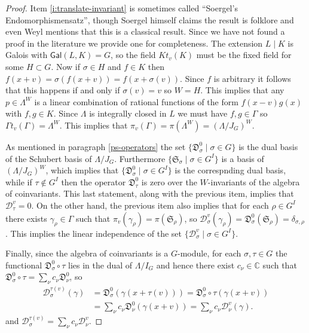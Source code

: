 \documentclass[11pt,fleqn]{article}
\newcommand\CC{\mathbb C}
\newcommand\D{\mathfrak D}
\newcommand\DD{\mathcal D}
\renewcommand\SS{\mathfrak S}
\begin{document}
\begin{proof}
Item \ref{i:translate-invariant} is sometimes called ``Soergel's 
Endomorphismensatz'', though Soergel himself claims the result is folklore and 
even Weyl mentions that this is a classical result. Since we have not found a 
proof in the literature we provide one for completeness. 
The extension $L \mid K$ is Galois with $\mathsf{Gal}(L, K) = G$, so the field
$Kt_v(K)$ must be the fixed field for some $H \subset G$. Now if $\sigma \in 
H$ and $f \in K$ then $f(x+v) = \sigma(f(x+v)) = f(x+\sigma(v))$. Since $f$ is
arbitrary it follows that this happens if and only if $\sigma(v) = v$
so $W = H$. This implies that any $p \in \Lambda^{W}$ is a linear 
combination of rational functions of the form $f(x-v) g(x)$ with 
$f,g \in K$. Since $\Lambda$ is integrally closed in $L$ we must have $f, g 
\in \Gamma$ so $\Gamma t_v(\Gamma) = \Lambda^W$. This implies that 
$\pi_v(\Gamma) = \pi(\Lambda^W) = (\Lambda/J_G)^W$.

As mentioned in paragraph \ref{ps-operators} the set $\{\D_\sigma^0 \mid
\sigma \in G\}$ is the dual basis of the Schubert basis of $\Lambda/J_G$.
Furthermore $\{\SS_\sigma \mid \sigma \in G^I\}$ is a basis of 
$(\Lambda/J_G)^W$, which implies that $\{\D_\sigma^0 \mid \sigma \in G^I\}$
is the correspnding dual basis, while if $\tau \notin G^I$ then the
operator $\D_\tau^0$ is zero over the $W$-invariants of the algebra of 
coinvariants. This last statement, along with the previous item, implies that
$\DD_\tau^v = 0$. On the other hand, the previous item also implies that for 
each $\rho \in G^I$ there exists $\gamma_\rho \in \Gamma$ such that
$\pi_v(\gamma_\rho) = \pi(\SS_\rho)$, so $\DD_\sigma^v(\gamma_\rho) = 
\D_\sigma^0(\SS_\rho) = \delta_{\sigma, \rho}$. This implies the linear 
independence of the set $\{\DD_\sigma^v \mid \sigma \in G^I\}$.

Finally, since the algebra of coinvariants is a $G$-module, for each $\sigma, 
\tau \in G$ the functional $\D_\sigma^0 \circ \tau$ lies in the dual of 
$\Lambda/I_G$ and hence there exist $c_\nu \in \CC$ such that $\D_\sigma^0 
\circ \tau = \sum_\nu c_\nu \D_\nu^0$, so
\begin{align*}
\DD_\sigma^{\tau(v)}(\gamma) 
	&= \D_\sigma^0(\gamma(x + \tau(v))) 
	= \D_\sigma^0 \circ \tau(\gamma(x+v))\\
	&= \sum_\nu c_\nu \D_\nu^0(\gamma(x+v))
	= \sum_\nu c_\nu \DD_\nu^v(\gamma).
\end{align*}
and $\DD_\sigma^{\tau(v)} = \sum_\nu c_\nu \DD^v_\nu$.
\end{proof}
\end{document}
